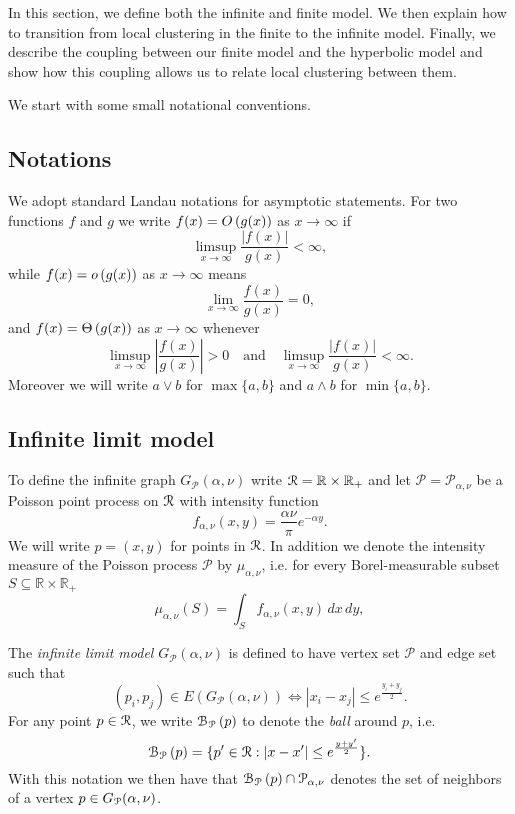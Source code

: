 In this section, we define both the infinite and finite model. We then explain how to transition from local clustering in the finite to the infinite model. Finally, we describe the coupling between our finite model and the hyperbolic model and show how this coupling allows us to relate local clustering between them.

We start with some small notational conventions.

\subsection{Notations}
We adopt standard Landau notations for asymptotic statements. For two functions $f$ and $g$ we write $f(x) = O\left(g(x)\right)$ as $x \to \infty$ if
\[
	\limsup_{x \to \infty} \frac{|f(x)|}{g(x)} < \infty,
\]
while $f(x) = o\left(g(x)\right)$ as $x \to \infty$ means
\[
	\lim_{x \to \infty} \frac{f(x)}{g(x)} = 0,
\]
and $f(x) = \Theta\left(g(x)\right)$ as $x \to \infty$ whenever
\[
	\limsup_{x \to \infty} \left|\frac{f(x)}{g(x)}\right| > 0 \quad \text{and} \quad
	\limsup_{x \to \infty} \frac{|f(x)|}{g(x)} < \infty.
\]
Moreover we will write $a \vee b$ for $\max\{a,b\}$ and $a \wedge b$ for $\min\{a,b\}$.

\subsection{Infinite limit model}\label{ssec:infinite_model}

To define the infinite graph $G_{\mathcal{P}}(\alpha, \nu)$ write ${\mathcal R} = \mathbb{R} \times \mathbb{R}_+$ and let $\mathcal{P}=\mathcal{P}_{\alpha,\nu}$ be a Poisson point process on ${\mathcal R}$ with intensity function
\begin{equation}\label{eq:def_intensity_function_f}
	f_{\alpha,\nu}(x,y) = \frac{\alpha \nu}{\pi} e^{-\alpha y}.
\end{equation} 
We will write $p = (x, y)$ for points in ${\mathcal R}$.  In addition we denote the intensity measure of the Poisson process $\mathcal{P}$ by $\mu_{\alpha, \nu}$, i.e. for every Borel-measurable subset $S \subseteq \mathbb{R} \times \mathbb{R}_+$
\begin{equation}\label{eq:def_mu_P}
	\mu_{\alpha,\nu}(S) = \int_S f_{\alpha,\nu}(x,y) \, dx \, dy,
\end{equation}

The \emph{infinite limit model} $G_{\mathcal{P}}(\alpha, \nu)$ is defined to have vertex set $\mathcal{P}$ and edge set such that
\[
	(p_i, p_j) \in E(G_{\mathcal{P}}(\alpha, \nu)) \iff |x_i - x_j| \leq e^{\frac{y_i + y_j}{2}}.
\]
For any point $p \in {\mathcal R}$, we write ${\mathcal B}_{{\mathcal P}}\left(p\right)$ to denote the \emph{ball} around $p$, i.e.
\begin{equation}\label{eq:def_ball_P}
	{\mathcal B}_{{\mathcal P}}\left(p\right) = \{p^\prime \in {\mathcal R} : |x - x^\prime| \leq e^{\frac{y + y^\prime}{2}}\}.
\end{equation}
With this notation we then have that ${\mathcal B}_{{\mathcal P}}\left(p\right) \cap {\mathcal P}_{\alpha, \nu}$ denotes the set of neighbors of a vertex $p \in G_{{\mathcal P}}(\alpha,\nu)$.

